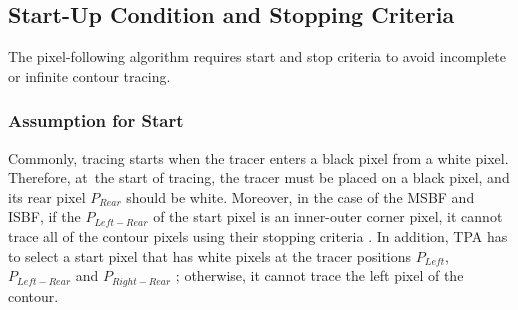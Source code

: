 \documentclass[sensors,article,accept,moreauthors,pdftex,10pt,a4paper]{mdpi}
\begin{document}
\subsection{Start-Up Condition and Stopping Criteria}

The pixel-following algorithm requires start and stop criteria to avoid incomplete or infinite contour tracing.

\subsubsection{Assumption for Start}


Commonly, tracing starts when the tracer enters a black pixel from a white pixel. Therefore, at~the start of tracing, the tracer must be placed on a black pixel, and its rear pixel $P_{Rear}$ should be white. Moreover, in the case of the MSBF and ISBF, if the $P_{Left-Rear}$ of the start pixel is an inner-outer corner pixel, it cannot trace all of the contour pixels using their stopping criteria \cite{Reddy2012Evaluation,Cheong2006Advanced}. In addition, TPA has to select a start pixel that has white pixels at the tracer positions $P_{Left}$, $P_{Left-Rear}$ and $P_{Right-Rear}$ \cite{Ghuneim2015Contour}; otherwise, it cannot trace the left pixel of the contour. 
\end{document}
